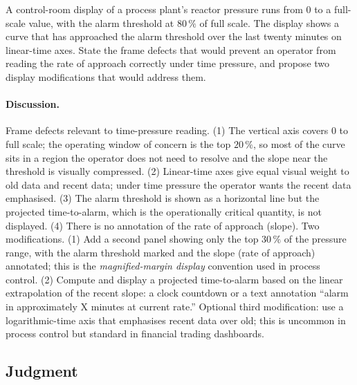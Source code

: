 \begin{exercise}
A control-room display of a process plant's reactor pressure runs
from $0$ to a full-scale value, with the alarm threshold at $80\,\%$
of full scale. The display shows a curve that has approached the
alarm threshold over the last twenty minutes on linear-time axes.
State the frame defects that would prevent an operator from reading
the rate of approach correctly under time pressure, and propose two
display modifications that would address them.

\paragraph{Discussion.}
Frame defects relevant to time-pressure reading. (1) The vertical
axis covers $0$ to full scale; the operating window of concern is
the top $20\,\%$, so most of the curve sits in a region the
operator does not need to resolve and the slope near the threshold
is visually compressed. (2) Linear-time axes give equal visual
weight to old data and recent data; under time pressure the
operator wants the recent data emphasised. (3) The alarm threshold
is shown as a horizontal line but the projected time-to-alarm,
which is the operationally critical quantity, is not displayed.
(4) There is no annotation of the rate of approach (slope).
Two modifications. (1) Add a second panel showing only the top
$30\,\%$ of the pressure range, with the alarm threshold marked
and the slope (rate of approach) annotated; this is the
\emph{magnified-margin display} convention used in process control.
(2) Compute and display a projected time-to-alarm based on the
linear extrapolation of the recent slope: a clock countdown or a
text annotation ``alarm in approximately X minutes at current
rate.'' Optional third modification: use a logarithmic-time axis
that emphasises recent data over old; this is uncommon in process
control but standard in financial trading dashboards.
\end{exercise}

\subsection*{Judgment}

